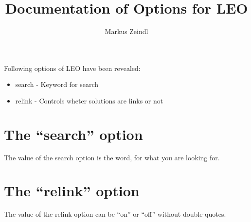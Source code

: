 \documentclass{article}
\title{Documentation of Options for LEO}
\author{Markus Zeindl}
\begin{document}
\maketitle
Following options of LEO have been revealed:
\begin{itemize}
\item{search - Keyword for search}
\item{relink - Controls wheter solutions are links or not}
\end{itemize}

\section{The ``search'' option}

The value of the search option is the word, for what you are looking for.

\section{The ``relink'' option}

The value of the relink option can be ``on'' or ``off'' without double-quotes.
\end{document}
